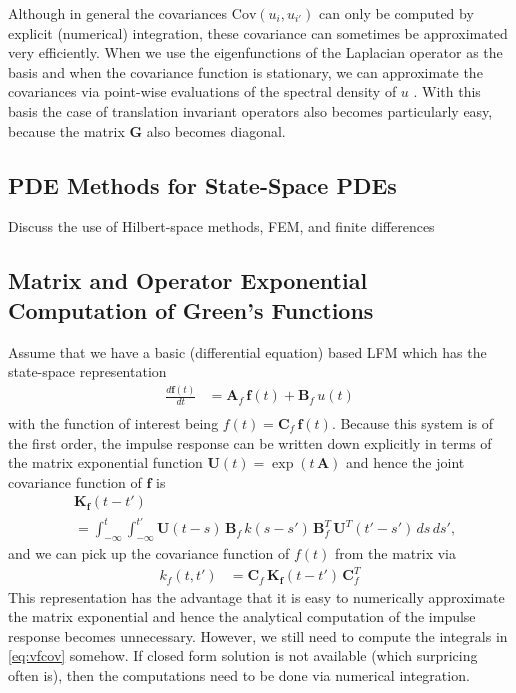 \documentclass[journal]{IEEEtran}
\newcommand{\simo}[1]{{\color{red}#1}}
\begin{document}
Although in general the covariances $\mathrm{Cov}(u_i,u_{i'})$ can only be computed by explicit (numerical) integration, these covariance can sometimes be approximated very efficiently. When we use the eigenfunctions of the Laplacian operator as the basis and when the covariance function is stationary, we can approximate the covariances via point-wise evaluations of the spectral density of $u$ \cite{Solin+Sarkka:2016}. With this basis the case of translation invariant operators also becomes particularly easy, because the matrix $\mathbf{G}$ also becomes diagonal.

\subsection{PDE Methods for State-Space PDEs}

\simo{Discuss the use of Hilbert-space methods, FEM, and finite differences}



\subsection{Matrix and Operator Exponential Computation of Green's Functions}
%
Assume that we have a basic (differential equation) based LFM which has the state-space representation
%
\begin{equation}
\begin{split}
  \frac{d\mathbf{f}(t)}{dt}
  &= \mathbf{A}_f \, \mathbf{f}(t) + \mathbf{B}_f \, u(t) \\
\end{split}
\end{equation}
%
with the function of interest being $f(t) = \mathbf{C}_f \, \mathbf{f}(t)$. Because this system is of the first order, the impulse response can be written down explicitly in terms of the matrix exponential function $\mathbf{U}(t) = \exp(t \, \mathbf{A})$ and hence the joint covariance function of $\mathbf{f}$ is
%
\begin{equation}
\begin{split}
  &\mathbf{K}_\mathbf{f}(t - t')
  \\ &
  =
  \int_{-\infty}^{t} \int_{-\infty}^{t'}
  \mathbf{U}(t - s) \, \mathbf{B}_f \, k(s - s') \,
  \mathbf{B}_f^T \, \mathbf{U}^T(t' - s') \, ds \, ds',
\end{split}
\label{eq:vfcov}
\end{equation}
%
and we can pick up the covariance function of $f(t)$ from the matrix via
%
\begin{equation}
\begin{split}
  k_f(t,t') &=
  \mathbf{C}_f \, \mathbf{K}_\mathbf{f}(t - t') \, \mathbf{C}_f^T
\end{split}
\label{eq:fcov2}
\end{equation}
%
This representation has the advantage that it is easy to numerically approximate the matrix exponential and hence the analytical computation of the impulse response becomes unnecessary. However, we still need to compute the integrals in \eqref{eq:vfcov} somehow. If closed form solution is not available (which surpricing often is), then the computations need to be done via numerical integration.
\end{document}
